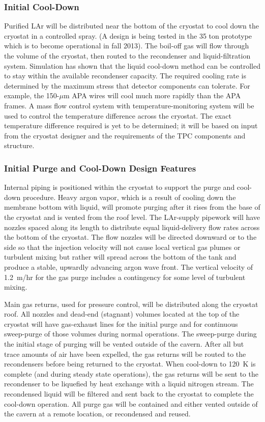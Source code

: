 \subsubsection{Initial Cool-Down}

Purified LAr will be distributed near
the bottom of the cryostat to cool down the cryostat in a controlled spray.
(A design is being tested in the 35 ton prototype which is to become
operational in fall 2013). The boil-off gas will flow through the volume of the cryostat, then
routed to the recondenser and liquid-filtration system. Simulation
has shown that the liquid cool-down method can
be controlled to stay within the available recondenser capacity. The required cooling rate
is determined by the maximum stress that detector components can
tolerate. For example, the 150-$\mu$m APA wires will cool much more rapidly than the APA frames.
A mass flow control system with temperature-monitoring system will be used to control the
temperature difference across the cryostat. The exact temperature difference required is yet to
be determined; it will be based on input from the cryostat designer and the requirements of
the TPC components and structure.

\subsubsection{Initial Purge and Cool-Down Design Features}

Internal piping is positioned within the cryostat to support the purge and cool-down procedure.  Heavy argon vapor, which is a result of cooling down the membrane bottom with liquid, will promote purging after it rises from the base of the cryostat and is vented from the roof level.  The LAr-supply pipework will have nozzles spaced along its length to 
 distribute equal liquid-delivery flow rates across the bottom of the cryostat.  The flow nozzles will be directed downward or to the side so that the injection velocity will not cause local vertical gas plumes or turbulent mixing but rather will spread across the bottom of the tank and produce a stable, upwardly advancing argon wave front. The vertical velocity of 1.2~m/hr for the gas purge includes a contingency for some level of turbulent mixing. 

Main gas returns, used for pressure control, will be distributed along the cryostat roof.  All nozzles and dead-end (stagnant) volumes located at the top of the cryostat will have gas-exhaust lines for the initial purge and for continuous sweep-purge of those volumes during normal operations.  
The sweep-purge during the initial stage of purging will be vented outside of the cavern.  After all but trace amounts of air have been expelled, the gas returns will be routed to the recondensers before being returned to the cryostat.  When cool-down to 120~K is complete (and during steady state operations), the gas returns will be sent to the recondenser to be liquefied by heat exchange with a liquid nitrogen stream.  The recondensed liquid will be filtered and sent back to the cryostat to complete the cool-down operation.
All purge gas will be contained and either vented outside of the cavern at a remote location, or recondensed and reused. 


